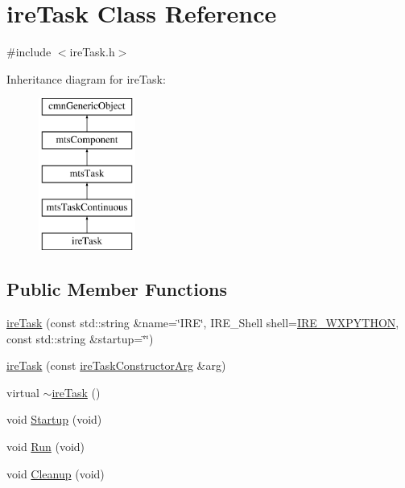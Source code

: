\hypertarget{classire_task}{}\section{ire\+Task Class Reference}
\label{classire_task}


{\ttfamily \#include $<$ire\+Task.\+h$>$}

Inheritance diagram for ire\+Task\+:\begin{figure}[H]
\begin{center}
\leavevmode
\includegraphics[height=5.000000cm]{d7/dd4/classire_task}
\end{center}
\end{figure}
\subsection*{Public Member Functions}
\begin{DoxyCompactItemize}
\item 
\hyperlink{classire_task_ade2dbb844ec030116011fef2d691fdd9}{ire\+Task} (const std\+::string \&name=\char`\"{}I\+R\+E\char`\"{}, I\+R\+E\+\_\+\+Shell shell=\hyperlink{ire_task_8h_acf351b6707399f614eed953a7c0c0d9aa659bffb40eea456bffe6e139d3d15477}{I\+R\+E\+\_\+\+W\+X\+P\+Y\+T\+H\+O\+N}, const std\+::string \&startup=\char`\"{}\char`\"{})
\item 
\hyperlink{classire_task_a94437d6aa990db9b83e6741939fbdeee}{ire\+Task} (const \hyperlink{classire_task_constructor_arg}{ire\+Task\+Constructor\+Arg} \&arg)
\item 
virtual \hyperlink{classire_task_aa104e5d7e21103122148fc23d33a0e5b}{$\sim$ire\+Task} ()
\item 
void \hyperlink{classire_task_a9f756fb7c148dada3054fcd5c24ff977}{Startup} (void)
\item 
void \hyperlink{classire_task_aa800f1928e669ace4ce6b7bda8611e59}{Run} (void)
\item 
void \hyperlink{classire_task_a11cb9740fc80625321092ffa9da5811f}{Cleanup} (void)
\end{DoxyCompactItemize}
